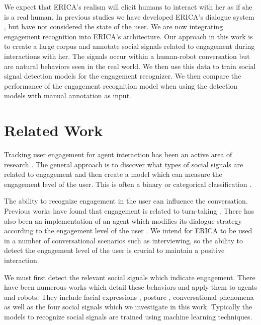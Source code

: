 \documentclass[letterpaper]{article} %
\begin{document}
We expect that ERICA's realism will elicit humans to interact with her as if she is a real human. In previous studies we have developed ERICA's dialogue system \cite{Lala2017,Milhorat2017}, but have not considered the state of the user. We are now integrating engagement recognition into ERICA's architecture. Our approach in this work is to create a large corpus and annotate social signals related to engagement during interactions with her. The signals occur within a human-robot conversation but are natural behaviors seen in the real world. We then use this data to train social signal detection models for the engagement recognizer. We then compare the performance of the engagement recognition model when using the detection models with manual annotation as input.


\section{Related Work}
Tracking user engagement for agent interaction has been an active area of research \cite{Rich2010,Forbes2012,Yu2016,Yu2017}. The general approach is to discover what types of social signals are related to engagement and then create a model which can measure the engagement level of the user. This is often a binary or categorical classification \cite{Bednarik2012}.

The ability to recognize engagement in the user can influence the conversation. Previous works have found that engagement is related to turn-taking \cite{Xu2013,Inoue2016}. There has also been an implementation of an agent which modifies its dialogue strategy according to the engagement level of the user \cite{Yu2016}. We intend for ERICA to be used in a number of conversational scenarios such as interviewing, so the ability to detect the engagement level of the user is crucial to maintain a positive interaction.

We must first detect the relevant social signals which indicate engagement. There have been numerous works which detail these behaviors and apply them to agents and robots. They include facial expressions \cite{Castellano2009,Yu2017}, posture \cite{Sanghvi2011}, conversational phenomena \cite{Rich2010,Xu2013} as well as the four social signals which we investigate in this work. Typically the models to recognize social signals are trained using machine learning techniques.
\end{document}
